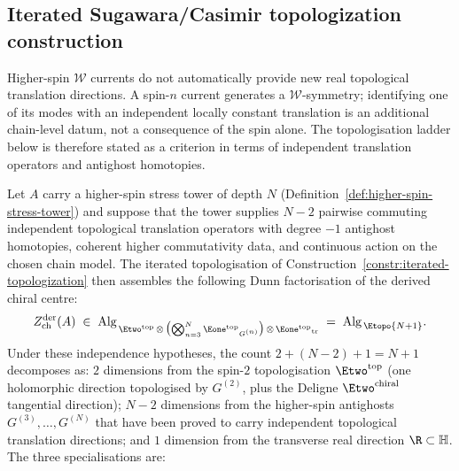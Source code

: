 \subsection{Iterated Sugawara/Casimir topologization construction}
\label{subsec:iterated-topologization-construction}

Higher-spin $\mathcal W$ currents do not automatically provide new
real topological translation directions. A spin-$n$ current generates
a $\mathcal W$-symmetry; identifying one of its modes with an
independent locally constant translation is an additional
chain-level datum, not a consequence of the spin alone. The
topologisation ladder below is therefore stated as a criterion in
terms of independent translation operators and antighost homotopies.

\begin{proposition}
\label{prop:stress-tower-dimension-count}
Let $A$ carry a higher-spin stress tower of depth $N$
\textup{(}Definition~\ref{def:higher-spin-stress-tower}\textup{)} and
suppose that the tower supplies $N-2$ pairwise commuting independent
topological translation operators with degree $-1$ antighost homotopies,
coherent higher commutativity data, and continuous action on the chosen
chain model. The iterated topologisation of
Construction~\ref{constr:iterated-topologization} then assembles the
following Dunn factorisation of the derived chiral centre:
\begin{equation}\label{eq:tower-dimension-dunn-factorisation}
Z^{\mathrm{der}}_{\mathrm{ch}}(A)
\;\in\;
\mathrm{Alg}_{\,\Etwo^{\mathrm{top}}
 \,\otimes\, \bigl(\bigotimes_{n = 3}^{N} {\Eone^{\mathrm{top}}}_{G^{(n)}}\bigr)
 \,\otimes\, {\Eone^{\mathrm{top}}}_{\mathrm{tr}}}
\;=\;
\mathrm{Alg}_{\,\Etopo{N+1}}.
\end{equation}
Under these independence hypotheses, the count
$2 + (N - 2) + 1 = N + 1$ decomposes as: $2$ dimensions from
the spin-$2$ topologisation $\Etwo^{\mathrm{top}}$ (one holomorphic
direction topologised by $G^{(2)}$, plus the Deligne
$\Etwo^{\mathrm{chiral}}$ tangential direction); $N - 2$ dimensions from
the higher-spin antighosts $G^{(3)}, \ldots, G^{(N)}$ that have been
proved to carry independent topological translation directions; and
$1$ dimension from the transverse real direction
$\R \subset \mathbb{H}$. The three specialisations are:
\begin{enumerate}[label=\textup{(\roman*)}]

\end{enumerate}
\end{proposition}
